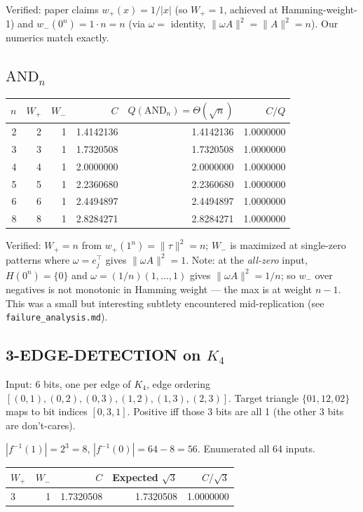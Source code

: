 \documentclass[11pt]{article}
\begin{document}
Verified: paper claims $w_+(x) = 1/|x|$ (so $W_+ = 1$, achieved at Hamming-weight-1) and $w_-(0^n) = 1 \cdot n = n$ (via $\omega =$ identity, $\|\omega A\|^2 = \|A\|^2 = n$). Our numerics match exactly.

\subsection{$\mathrm{AND}_n$}

\begin{center}
\begin{tabular}{@{}rrrrrr@{}}
\toprule
$n$ & $W_+$ & $W_-$ & $C$ & $Q(\mathrm{AND}_n) = \Theta(\sqrt{n})$ & $C/Q$ \\
\midrule
2 & 2 & 1 & 1.4142136 & 1.4142136 & 1.0000000 \\
3 & 3 & 1 & 1.7320508 & 1.7320508 & 1.0000000 \\
4 & 4 & 1 & 2.0000000 & 2.0000000 & 1.0000000 \\
5 & 5 & 1 & 2.2360680 & 2.2360680 & 1.0000000 \\
6 & 6 & 1 & 2.4494897 & 2.4494897 & 1.0000000 \\
8 & 8 & 1 & 2.8284271 & 2.8284271 & 1.0000000 \\
\bottomrule
\end{tabular}
\end{center}

Verified: $W_+ = n$ from $w_+(1^n) = \|\tau\|^2 = n$; $W_-$ is maximized at single-zero patterns where $\omega = e_j^\top$ gives $\|\omega A\|^2 = 1$. Note: at the \emph{all-zero} input, $H(0^n) = \{0\}$ and $\omega = (1/n)(1,\dots,1)$ gives $\|\omega A\|^2 = 1/n$; so $w_-$ over negatives is not monotonic in Hamming weight --- the max is at weight $n{-}1$. This was a small but interesting subtlety encountered mid-replication (see \texttt{failure\_analysis.md}).

\subsection{3-EDGE-DETECTION on $K_4$}

Input: 6 bits, one per edge of $K_4$, edge ordering $[(0,1), (0,2), (0,3), (1,2), (1,3), (2,3)]$. Target triangle $\{01, 12, 02\}$ maps to bit indices $[0, 3, 1]$. Positive iff those 3 bits are all 1 (the other 3 bits are don't-cares).

$|f^{-1}(1)| = 2^3 = 8$, $|f^{-1}(0)| = 64 - 8 = 56$. Enumerated all 64 inputs.

\begin{center}
\begin{tabular}{@{}lrrrr@{}}
\toprule
$W_+$ & $W_-$ & $C$ & Expected $\sqrt{3}$ & $C/\sqrt{3}$ \\
\midrule
3 & 1 & 1.7320508 & 1.7320508 & 1.0000000 \\
\bottomrule
\end{tabular}
\end{center}
\end{document}
